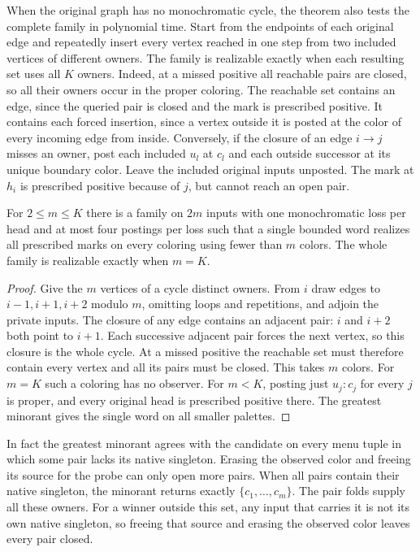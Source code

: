 When the original graph has no monochromatic cycle, the theorem also
tests the complete family in polynomial time. Start from the endpoints
of each original edge and repeatedly insert every vertex reached in
one step from two included vertices of different owners. The family
is realizable exactly when each resulting set uses all $K$ owners.
Indeed, at a missed positive all reachable pairs are closed, so all
their owners occur in the proper coloring. The reachable set contains
an edge, since the queried pair is closed and the mark is prescribed
positive. It contains each forced insertion, since a vertex outside
it is posted at the color of every incoming edge from inside.
Conversely, if the closure of an edge $i\to j$ misses an owner,
post each included $u_l$ at $c_l$ and each outside successor at its
unique boundary color. Leave the included original inputs unposted.
The mark at $h_i$ is prescribed positive because of $j$, but cannot
reach an open pair.

\begin{corollary}
\label{core:cor:reciprocal-pair-colors}
For $2\le m\le K$ there is a family on $2m$ inputs with one
monochromatic loss per head and at most four postings per loss
such that a single bounded word realizes all prescribed marks on
every coloring using fewer than $m$ colors. The whole family is
realizable exactly when $m=K$.
\end{corollary}
\begin{proof}
Give the $m$ vertices of a cycle distinct owners. From $i$ draw
edges to $i-1,i+1,i+2$ modulo $m$, omitting loops and repetitions,
and adjoin the private inputs. The closure of any edge contains an
adjacent pair: $i$ and $i+2$ both point to $i+1$. Each successive
adjacent pair forces the next vertex, so this closure is the whole
cycle. At a missed positive the reachable set must therefore contain
every vertex and all its pairs must be closed. This takes $m$ colors.
For $m=K$ such a coloring has no observer. For $m<K$, posting just
$u_j{:}c_j$ for every $j$ is proper, and every original head is
prescribed positive there. The greatest minorant gives the single
word on all smaller palettes.
\end{proof}

In fact the greatest minorant agrees with the candidate on every menu
tuple in which some pair lacks its native singleton. Erasing the
observed color and freeing its source for the probe can only open
more pairs. When all pairs contain their native singleton, the
minorant returns exactly $\{c_1,\ldots,c_m\}$. The pair folds supply
all these owners. For a winner outside this set, any input that
carries it is not its own native singleton, so freeing that source
and erasing the observed color leaves every pair closed.

